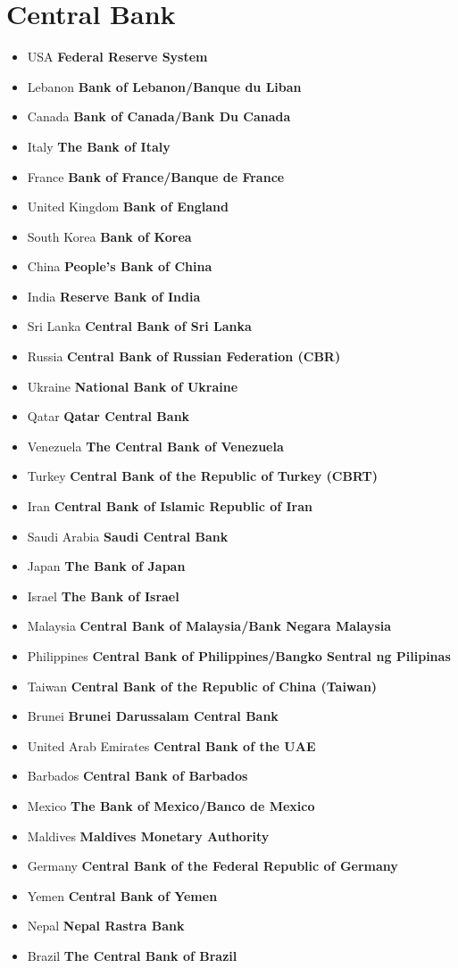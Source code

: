 \documentclass[11pt]{article}
\begin{document}
\section{Central Bank}
\label{sec:orgce05cd2}
\begin{itemize}
\item USA   \textbf{Federal Reserve System}
\item Lebanon  \textbf{Bank of Lebanon/Banque du Liban}
\item Canada \textbf{Bank of Canada/Bank Du Canada}
\item Italy \textbf{The Bank of Italy}
\item France  \textbf{Bank of France/Banque de France}
\item United Kingdom  \textbf{Bank of England}
\item South Korea  \textbf{Bank of Korea}
\item China  \textbf{People's Bank of China}
\item India  \textbf{Reserve Bank of India}
\item Sri Lanka  \textbf{Central Bank of Sri Lanka}
\item Russia  \textbf{Central Bank of Russian Federation (CBR)}
\item Ukraine  \textbf{National Bank of Ukraine}
\item Qatar \textbf{Qatar Central Bank}
\item Venezuela \textbf{The Central Bank of Venezuela}
\item Turkey \textbf{Central Bank of the Republic of Turkey (CBRT)}
\item Iran  \textbf{Central Bank of Islamic Republic of Iran}
\item Saudi Arabia  \textbf{Saudi Central Bank}
\item Japan \textbf{The Bank of Japan}
\item Israel  \textbf{The Bank of Israel}
\item Malaysia \textbf{Central Bank of Malaysia/Bank Negara Malaysia}
\item Philippines \textbf{Central Bank of Philippines/Bangko Sentral ng Pilipinas}
\item Taiwan \textbf{Central Bank of the Republic of China (Taiwan)}
\item Brunei  \textbf{Brunei Darussalam Central Bank}
\item United Arab Emirates \textbf{Central Bank of the UAE}
\item Barbados \textbf{Central Bank of Barbados}
\item Mexico \textbf{The Bank of Mexico/Banco de Mexico}
\item Maldives \textbf{Maldives Monetary Authority}
\item Germany \textbf{Central Bank of the Federal Republic of Germany}
\item Yemen  \textbf{Central Bank of Yemen}
\item Nepal \textbf{Nepal Rastra Bank}
\item Brazil \textbf{The Central Bank of Brazil}
\end{itemize}
\end{document}
